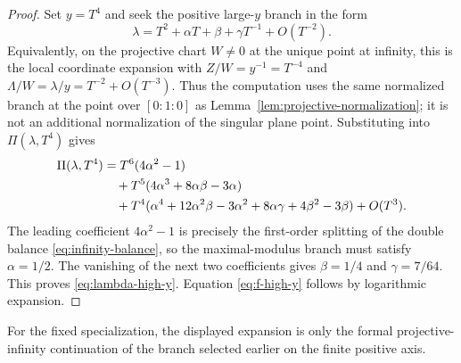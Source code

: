 \begin{proof}
Set $y=T^4$ and seek the positive large-\(y\) branch in the form
\[
\lambda=T^2+\alpha T+\beta+\gamma T^{-1}+O(T^{-2}).
\]
Equivalently, on the projective chart $W\neq0$ at the unique point at infinity, this is the local coordinate expansion with $Z/W=y^{-1}=T^{-4}$ and $\Lambda/W=\lambda/y=T^{-2}+O(T^{-3})$.
Thus the computation uses the same normalized branch at the point over \([0:1:0]\) as Lemma~\ref{lem:projective-normalization}; it is not an additional normalization of the singular plane point.
Substituting into $\Pi(\lambda,T^4)$ gives
\begin{align}
\Pi(\lambda,T^4)
&=
T^6(4\alpha^2-1) \notag\\
&\quad
+T^5(4\alpha^3+8\alpha\beta-3\alpha) \notag\\
&\quad
+T^4(\alpha^4+12\alpha^2\beta-3\alpha^2+8\alpha\gamma+4\beta^2-3\beta)
+O(T^3). \label{eq:infinity-expansion}
\end{align}
The leading coefficient $4\alpha^2-1$ is precisely the first-order splitting of the double balance \eqref{eq:infinity-balance}, so the maximal-modulus branch must satisfy $\alpha=1/2$.
The vanishing of the next two coefficients gives $\beta=1/4$ and $\gamma=7/64$.
This proves \eqref{eq:lambda-high-y}.
Equation \eqref{eq:f-high-y} follows by logarithmic expansion.
\end{proof}

For the fixed specialization, the displayed expansion is only the formal projective-infinity continuation of the branch selected earlier on the finite positive axis.
